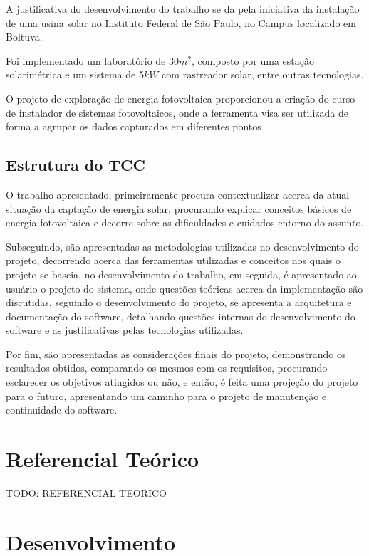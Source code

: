 A justificativa do desenvolvimento do trabalho se da pela iniciativa da instalação de uma usina solar no Instituto Federal de São Paulo, no Campus localizado em Boituva.

Foi implementado um laboratório de 30$m^2$, composto por uma estação solarimétrica e um sistema de 5$kW$ com rastreador solar, entre outras tecnologias.

O projeto de exploração de energia fotovoltaica proporcionou a criação do curso de instalador de sistemas fotovoltaicos, onde a ferramenta visa ser utilizada de forma a agrupar os dados capturados em diferentes pontos \cite{solar_ifsp_btv}.

\section{Estrutura do TCC}

O trabalho apresentado, primeiramente procura contextualizar acerca da atual situação da captação de energia solar, procurando explicar conceitos básicos de energia fotovoltaica e decorre sobre as dificuldades e cuidados entorno do assunto.

Subseguindo, são apresentadas as metodologias utilizadas no desenvolvimento do projeto, decorrendo acerca das ferramentas utilizadas e conceitos nos quais o projeto se baseia, no desenvolvimento do trabalho, em seguida, é apresentado ao usuário o projeto do sistema, onde questões teóricas acerca da implementação são discutidas, seguindo o desenvolvimento do projeto, se apresenta a arquitetura e documentação do software, detalhando questões internas do desenvolvimento do software e as justificativas pelas tecnologias utilizadas.

Por fim, são apresentadas as considerações finais do projeto, demonstrando os resultados obtidos, comparando os mesmos com os requisitos, procurando esclarecer os objetivos atingidos ou não, e então, é feita uma projeção do projeto para o futuro, apresentando um caminho para o projeto de manutenção e continuidade do software.

\chapter{Referencial Teórico}

TODO: REFERENCIAL TEORICO

\chapter{Desenvolvimento}

